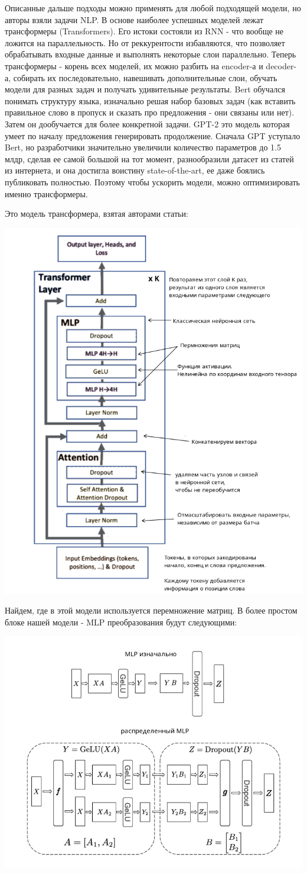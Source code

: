 Описанные дальше подходы можно применять для любой подходящей модели, но авторы взяли задачи NLP. В основе наиболее успешных моделей лежат трансформеры (Transformers). Его истоки состояли из RNN - что вообще не ложится на параллельность. Но \cite{vaswani2017attention} от реккурентости избавляются, что позволяет обрабатывать входные данные и выполнять некоторые слои параллельно. Теперь трансформеры - корень всех моделей, их можно разбить на encoder-а и decoder-а, собирать их последовательно, навешивать дополнительные слои, обучать модели для разных задач и получать удивительные результаты. Bert обучался понимать структуру языка, изначально решая набор базовых задач (как вставить правильное слово в пропуск и сказать про предложения - они связаны или нет). Затем он дообучается для более конкретной задачи. GPT-2 это модель которая умеет по началу предложения генерировать продолжение. Сначала GPT уступало Bert, но разработчики значительно увеличили количество параметров до 1.5 млдр, сделав ее самой большой на тот момент, разнообразили датасет из статей из интернета, и она достигла воистину state-of-the-art, ее даже боялись публиковать полностью. Поэтому чтобы ускорить модели, можно оптимизировать именно трансформеры.

 Это модель трансформера, взятая авторами статьи:
 

\includegraphics[width=0.6\linewidth]{Parts/images/TP_Transformer.png}

Найдем, где в этой модели используется перемножение матриц. В более простом блоке нашей модели - MLP преобразования будут следующими:

\includegraphics[width=0.6\linewidth]{Parts/images/TP_MLP.png}

